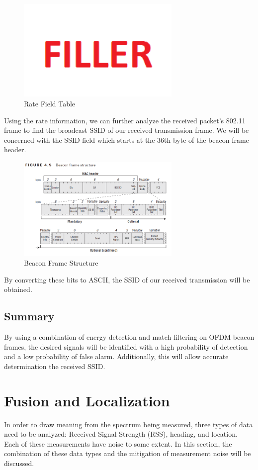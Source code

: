 \begin{figure}[ht!]
	\centering
	\includegraphics[width=0.70\textwidth]{img/filler}
	\caption{Rate Field Table}
	\label{fig:ofdm_rate_table}
\end{figure}\par
Using the rate information, we can further analyze the received packet’s 802.11 frame to find the broadcast SSID of our received transmission frame. We will be concerned with the SSID field which starts at the 36th byte of the beacon frame header. 
\begin{figure}[ht!]
	\centering
	\includegraphics[width=0.70\textwidth]{img/beacon_frame}
	\caption{Beacon Frame Structure}
	\label{fig:beacon_frame}
\end{figure}\par
By converting these bits to ASCII, the SSID of our received transmission will be obtained.
\subsection{Summary}
By using a combination of energy detection and match filtering on OFDM beacon frames,  the desired signals will be identified  with a high probability of detection and a low probability of false alarm. Additionally, this will allow accurate determination the received SSID.

\section{Fusion and Localization}
In order to draw meaning from the spectrum being measured, three types of data need to be analyzed: Received Signal Strength (RSS), heading, and location. Each of these measurements have noise to some extent. In this section, the combination of these data types and the mitigation of measurement noise will be discussed.\par  
